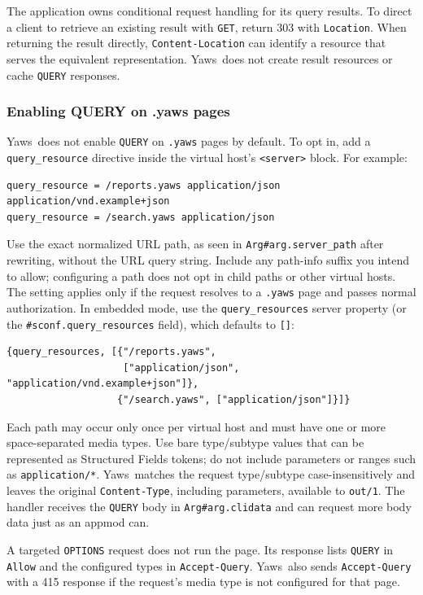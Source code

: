 \documentclass[11pt,oneside,english]{book}
\newcommand{\Yaws}            %
        {{\sc Yaws}}
\begin{document}
The application owns conditional request handling for its query results. To
direct a client to retrieve an existing result with \verb+GET+, return 303
with \verb+Location+. When returning the result directly,
\verb+Content-Location+ can identify a resource that serves the equivalent
representation. \Yaws\ does not create result resources or cache
\verb+QUERY+ responses.

\subsubsection{Enabling QUERY on .yaws pages}

\Yaws\ does not enable \verb+QUERY+ on \verb+.yaws+ pages by default.
To opt in, add a \verb+query_resource+ directive inside the virtual
host's \verb+<server>+ block. For example:

\begin{verbatim}
query_resource = /reports.yaws application/json application/vnd.example+json
query_resource = /search.yaws application/json
\end{verbatim}

Use the exact normalized URL path, as seen in \verb+Arg#arg.server_path+
after rewriting, without the URL query string. Include any path-info
suffix you intend to allow; configuring a path does not opt in child
paths or other virtual hosts. The setting applies only if the request
resolves to a \verb+.yaws+ page and passes normal authorization. In
embedded mode, use the \verb+query_resources+ server property (or the
\verb+#sconf.query_resources+ field), which defaults to \verb+[]+:

\begin{verbatim}
{query_resources, [{"/reports.yaws",
                    ["application/json", "application/vnd.example+json"]},
                   {"/search.yaws", ["application/json"]}]}
\end{verbatim}

Each path may occur only once per virtual host and must have one or
more space-separated media types. Use bare type/subtype values that can
be represented as Structured Fields tokens; do not include parameters
or ranges such as \verb+application/*+. \Yaws\ matches the request
type/subtype case-insensitively and leaves the original
\verb+Content-Type+, including parameters, available to \verb+out/1+.
The handler receives the \verb+QUERY+ body in \verb+Arg#arg.clidata+
and can request more body data just as an appmod can.

A targeted \verb+OPTIONS+ request does not run the page. Its response
lists \verb+QUERY+ in \verb+Allow+ and the configured types in
\verb+Accept-Query+. \Yaws\ also sends \verb+Accept-Query+ with a 415
response if the request's media type is not configured for that page.
\end{document}
